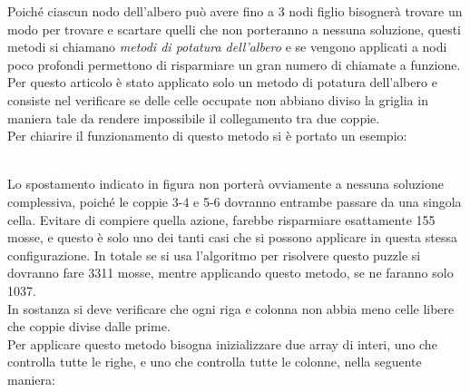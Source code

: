 \documentclass[11pt,a4paper,twocolumn]{IEEEtran}
\newcommand{\mysvg}[2]{}
\newcounter{algoritmo}
\begin{document}
	Poiché ciascun nodo dell'albero può avere fino a 3 nodi figlio bisognerà trovare un modo per trovare e scartare quelli che non porteranno a nessuna soluzione, questi metodi si chiamano \textit{metodi di potatura dell'albero} e se vengono applicati a nodi poco profondi permettono di risparmiare un gran numero di chiamate a funzione.\medskip\\
	Per questo articolo è stato applicato solo un metodo di potatura dell'albero e consiste nel verificare se delle celle occupate non abbiano diviso la griglia in maniera tale da rendere impossibile il collegamento tra due coppie.\medskip\\
	Per chiarire il funzionamento di questo metodo si è portato un esempio:\\
	\vspace*{-.5cm}
	\begin{figure}[h]
		\centering
		\text{}\hspace*{0.5cm}{\large\mysvg{giacomo}{4}}
	\end{figure}\\
	Lo spostamento indicato in figura non porterà ovviamente a nessuna soluzione complessiva, poiché le coppie 3-4 e 5-6 dovranno entrambe passare da una singola cella. Evitare di compiere quella azione, farebbe risparmiare esattamente 155 mosse, e questo è solo uno dei tanti casi che si possono applicare in questa stessa configurazione. In totale se si usa l'algoritmo per risolvere questo puzzle si dovranno fare 3311 mosse, mentre applicando questo metodo, se ne faranno solo 1037.\vspace{3cm}\\
	In sostanza si deve verificare che ogni riga e colonna non abbia meno celle libere che coppie divise dalle prime.\medskip\\
	Per applicare questo metodo bisogna inizializzare due array di interi, uno che controlla tutte le righe, e uno che controlla tutte le colonne, nella seguente maniera:
\end{document}
